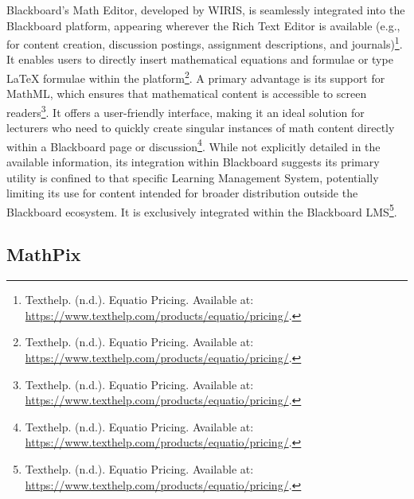 Blackboard's Math Editor, developed by WIRIS, is seamlessly integrated into the Blackboard platform, appearing wherever the Rich Text Editor is available (e.g., for content creation, discussion postings, assignment descriptions, and journals)\footnote{Texthelp. (n.d.). Equatio Pricing. Available at: \url{https://www.texthelp.com/products/equatio/pricing/}.}. It enables users to directly insert mathematical equations and formulae or type LaTeX formulae within the platform\footnote{Texthelp. (n.d.). Equatio Pricing. Available at: \url{https://www.texthelp.com/products/equatio/pricing/}.}. A primary advantage is its support for MathML, which ensures that mathematical content is accessible to screen readers\footnote{Texthelp. (n.d.). Equatio Pricing. Available at: \url{https://www.texthelp.com/products/equatio/pricing/}.}. It offers a user-friendly interface, making it an ideal solution for lecturers who need to quickly create singular instances of math content directly within a Blackboard page or discussion\footnote{Texthelp. (n.d.). Equatio Pricing. Available at: \url{https://www.texthelp.com/products/equatio/pricing/}.}. While not explicitly detailed in the available information, its integration within Blackboard suggests its primary utility is confined to that specific Learning Management System, potentially limiting its use for content intended for broader distribution outside the Blackboard ecosystem. It is exclusively integrated within the Blackboard LMS\footnote{Texthelp. (n.d.). Equatio Pricing. Available at: \url{https://www.texthelp.com/products/equatio/pricing/}.}.

\subsection{MathPix}

